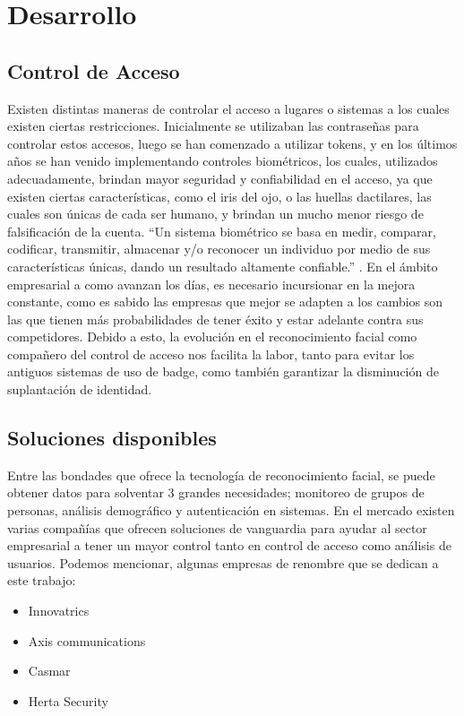 \documentclass[conference]{IEEEtran}
\begin{document}
\section{Desarrollo}
\subsection{Control de Acceso}\label{AA}
Existen distintas maneras de controlar el acceso a lugares o sistemas a los cuales existen ciertas restricciones. Inicialmente se utilizaban las contraseñas para controlar estos accesos, luego se han comenzado a utilizar tokens, y en los últimos años se han venido implementando controles biométricos, los cuales, utilizados adecuadamente, brindan mayor seguridad y confiabilidad en el acceso, ya que existen ciertas características, como el iris del ojo, o las huellas dactilares, las cuales son únicas de cada ser humano, y brindan un mucho menor riesgo de falsificación de la cuenta. “Un sistema biométrico se basa en medir, comparar, codificar, transmitir, almacenar y/o reconocer un individuo por medio de sus características únicas, dando un resultado altamente confiable.” \cite{b1}.
En el ámbito empresarial a como avanzan los días, es necesario incursionar en la mejora constante, como es sabido las empresas que mejor se adapten a los cambios son las que tienen más probabilidades de tener éxito y estar adelante contra sus competidores. Debido a esto, la evolución en el reconocimiento facial como compañero del control de acceso nos facilita la labor, tanto para evitar los antiguos sistemas de uso de badge, como también garantizar la disminución de suplantación de identidad.


\subsection{Soluciones disponibles}
Entre las bondades que ofrece la tecnología de reconocimiento facial, se puede obtener datos para solventar 3 grandes necesidades; monitoreo de grupos de personas, análisis demográfico y autenticación en sistemas. 
En el mercado existen varias compañías que ofrecen soluciones de vanguardia para ayudar al sector empresarial a tener un mayor control tanto en control de acceso como análisis de usuarios. Podemos mencionar, algunas empresas de renombre que se dedican a este trabajo: 

\begin{itemize}
\item Innovatrics 
\item Axis communications
\item Casmar
\item Herta Security
\end{itemize}
\end{document}
